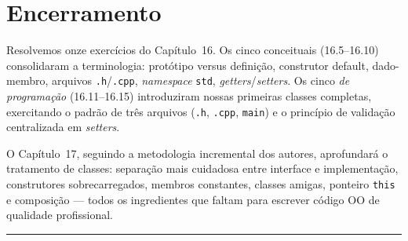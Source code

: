 \documentclass[11pt,a4paper]{article}
\begin{document}
\section*{Encerramento}

Resolvemos onze exerc\'icios do Cap\'itulo~16. Os cinco conceituais (16.5--16.10) consolidaram a terminologia: prot\'otipo versus defini\c{c}\~ao, construtor default, dado-membro, arquivos \texttt{.h}/\texttt{.cpp}, \emph{namespace} \texttt{std}, \emph{getters}/\emph{setters}. Os cinco \emph{de programa\c{c}\~ao} (16.11--16.15) introduziram nossas primeiras classes completas, exercitando o padr\~ao de tr\^es arquivos (\texttt{.h}, \texttt{.cpp}, \texttt{main}) e o princ\'ipio de valida\c{c}\~ao centralizada em \emph{setters}.

O Cap\'itulo~17, seguindo a metodologia incremental dos autores, aprofundar\'a o tratamento de classes: separa\c{c}\~ao mais cuidadosa entre interface e implementa\c{c}\~ao, construtores sobrecarregados, membros constantes, classes amigas, ponteiro \texttt{this} e composi\c{c}\~ao --- todos os ingredientes que faltam para escrever c\'odigo OO de qualidade profissional.

\vspace{1em}
\begin{center}\rule{0.5\textwidth}{0.4pt}\end{center}
\end{document}
